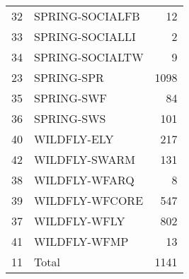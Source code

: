 \begin{tabular}{llr}
32 &        SPRING-SOCIALFB &    12 \\
33 &        SPRING-SOCIALLI &     2 \\
34 &        SPRING-SOCIALTW &     9 \\
23 &             SPRING-SPR &  1098 \\
35 &             SPRING-SWF &    84 \\
36 &             SPRING-SWS &   101 \\
40 &            WILDFLY-ELY &   217 \\
42 &          WILDFLY-SWARM &   131 \\
38 &          WILDFLY-WFARQ &     8 \\
39 &         WILDFLY-WFCORE &   547 \\
37 &           WILDFLY-WFLY &   802 \\
41 &           WILDFLY-WFMP &    13 \\
11 &        Total & 1141\\
\bottomrule
\end{tabular}
